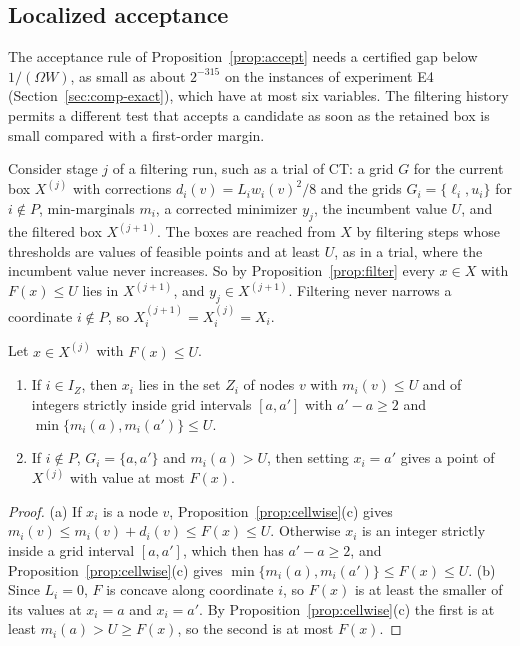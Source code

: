 \subsection{Localized acceptance}\label{sec:localized}
The acceptance rule of Proposition~\ref{prop:accept} needs a certified gap
below $1/(\Omega W)$, as small as about $2^{-315}$ on the instances of
experiment E4 (Section~\ref{sec:comp-exact}), which have at most six
variables. The filtering
history permits a different test that accepts a candidate as soon as the retained box
is small compared with a first-order margin.

Consider stage $j$ of a filtering run, such as a trial of CT: a grid $G$ for
the current box $X^{(j)}$ with corrections $d_i(v)=L_iw_i(v)^2/8$ and the
grids $G_i=\{\ell_i,u_i\}$ for $i\notin P$, min-marginals $m_i$, a corrected
minimizer $y_j$, the incumbent value $U$, and the filtered box $X^{(j+1)}$.
The boxes are reached from $X$ by filtering steps whose thresholds are values
of feasible points and at least $U$, as in a trial, where the incumbent value
never increases. So by Proposition~\ref{prop:filter} every $x\in X$ with
$F(x)\le U$ lies in $X^{(j+1)}$, and $y_j\in X^{(j+1)}$. Filtering never
narrows a coordinate $i\notin P$, so $X^{(j+1)}_i=X^{(j)}_i=X_i$.

\begin{lemma}\label{lem:node}
Let $x\in X^{(j)}$ with $F(x)\le U$.
\begin{enumerate}[label=(\alph*)]
\item If $i\in I_Z$, then $x_i$ lies in the set $Z_i$ of nodes $v$ with
$m_i(v)\le U$ and of integers strictly inside grid intervals $[a,a']$ with
$a'-a\ge2$ and $\min\{m_i(a),m_i(a')\}\le U$.
\item If $i\notin P$, $G_i=\{a,a'\}$ and $m_i(a)>U$, then setting $x_i=a'$
gives a point of $X^{(j)}$ with value at most $F(x)$.
\end{enumerate}
\end{lemma}

\begin{proof}
(a) If $x_i$ is a node $v$, Proposition~\ref{prop:cellwise}(c) gives
$m_i(v)\le m_i(v)+d_i(v)\le F(x)\le U$. Otherwise $x_i$ is an integer strictly
inside a grid interval $[a,a']$, which then has $a'-a\ge2$, and
Proposition~\ref{prop:cellwise}(c) gives $\min\{m_i(a),m_i(a')\}\le F(x)\le U$.
(b) Since $L_i=0$, $F$ is concave along coordinate $i$, so $F(x)$ is at least
the smaller of its values at $x_i=a$ and $x_i=a'$. By
Proposition~\ref{prop:cellwise}(c) the first is at least $m_i(a)>U\ge F(x)$,
so the second is at most $F(x)$.
\end{proof}

